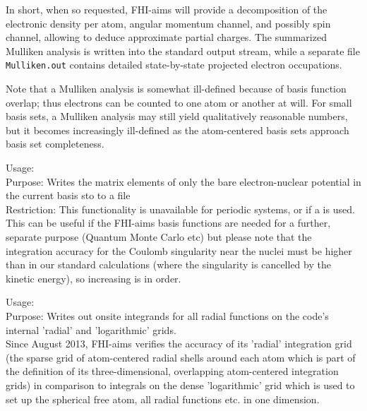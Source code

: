 In short, when so requested, FHI-aims will provide a decomposition of
the electronic density per atom, angular momentum channel, and
possibly spin channel, allowing to deduce approximate partial
charges. The summarized Mulliken analysis is written into the standard
output stream, while a separate file \texttt{Mulliken.out} contains
detailed state-by-state projected electron occupations. 

Note that a Mulliken analysis is somewhat ill-defined because of basis
function overlap; thus electrons can be counted to one atom or another
at will. For small basis sets, a Mulliken analysis may still yield
qualitatively reasonable numbers, but it becomes increasingly
ill-defined as the atom-centered basis sets approach basis set
completeness. 

{
  \noindent
  Usage:   \\[1.0ex]
  Purpose: Writes the matrix elements of only the bare electron-nuclear
  potential in the current basis sto to a file
  \\[1.0ex] 
  Restriction: This functionality is unavailable for periodic systems,
    or if a  is used. \\[1.0ex]
}
This can be useful if the FHI-aims basis functions are needed for a further,
  separate purpose (Quantum Monte Carlo etc) but please note that the
  integration accuracy for the Coulomb singularity near the nuclei must be
  higher than in our standard calculations (where the singularity is cancelled
  by the kinetic energy), so increasing
   is in order.

{
  \noindent
  Usage:   \\[1.0ex]
  Purpose: Writes out onsite integrands for all radial functions on
           the code's internal 'radial' and 'logarithmic' grids. \\[1.0ex]
}
Since August 2013, FHI-aims verifies the accuracy of its 'radial' integration 
grid (the sparse grid of atom-centered radial shells around each atom which
is part of the definition of its three-dimensional, overlapping atom-centered
integration grids) in comparison to integrals on the dense 'logarithmic' grid
which is used to set up the spherical free atom, all radial functions etc. in
one dimension. 

